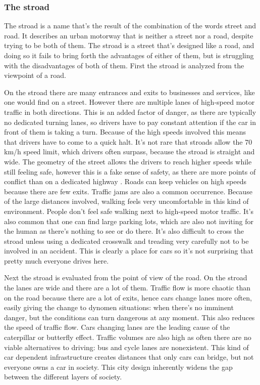 \documentclass[
]{elteikthesis}[2023/04/10]
\begin{document}
\subsubsection*{The stroad}

The stroad is a name that's the result of the combination of the words
street and road. It describes an urban motorway that is neither a
street nor a road, despite trying to be both of them. The stroad is
a street that's designed like a road, and doing so it fails to bring
forth the advantages of either of them, but is struggling with the
disadvantages of both of them. First the stroad is analyzed from the
viewpoint of a road.

On the stroad there are many entrances and exits to businesses and
services, like one would find on a street. However there are multiple
lanes of high-speed motor traffic in both directions. This is an added
factor of danger, as there are typically no dedicated turning lanes,
so drivers have to pay constant attention if the car in front of them
is taking a turn. Because of the high speeds involved this means that
drivers have to come to a quick halt. It's not rare that stroads allow
the 70 km/h speed limit, which drivers often surpass, because the
stroad is straight and wide. The geometry of the street allows the
drivers to reach higher speeds while still feeling safe, however this
is a fake sense of safety, as there are more points of conflict than
on a dedicated highway \cite{marohn2012thoughts}. Roads can keep
vehicles on high speeds because there are few exits. Traffic jams
are also a common occurrence. Because of the large distances involved,
walking feels very uncomfortable in this kind of environment. People
don't feel safe walking next to high-speed motor traffic. It's also
common that one can find large parking lots, which are also not inviting
for the human as there's nothing to see or do there. It's also difficult
to cross the stroad unless using a dedicated crosswalk and treading
very carefully not to be involved in an accident. This is clearly
a place for cars so it's not surprising that pretty much everyone
drives here. 

Next the stroad is evaluated from the point of view of the road. On
the stroad the lanes are wide and there are a lot of them. Traffic
flow is more chaotic than on the road because there are a lot of exits,
hence cars change lanes more often, easily giving the change to dynomen
situations: when there's no imminent danger, but the conditions can
turn dangerous at any moment. This also reduces the speed of traffic
flow. Cars changing lanes are the leading cause of the caterpillar
or butterfly effect. Traffic volumes are also high as often there
are no viable alternatives to driving: bus and cycle lanes are nonexistent.
This kind of car dependent infrastructure creates distances that only
cars can bridge, but not everyone owns a car in society. This city
design inherently widens the gap between the different layers of society.
\end{document}
